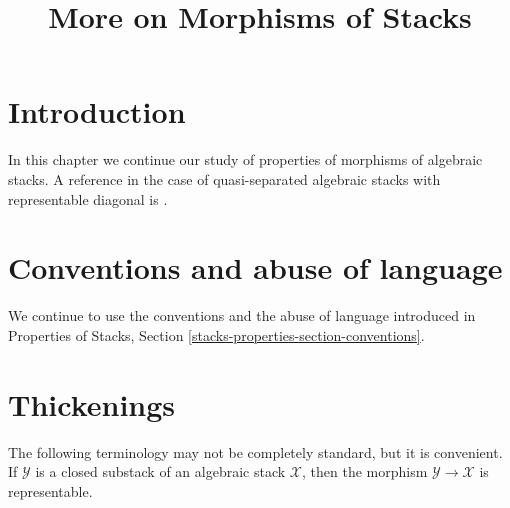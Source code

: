 

%


\title{More on Morphisms of Stacks}


\maketitle

\label{section-phantom}

\tableofcontents

\section{Introduction}
\label{section-introduction}

\noindent
In this chapter we continue our study of properties of morphisms of algebraic
stacks. A reference in the case of quasi-separated algebraic stacks with
representable diagonal is \cite{LM-B}.




\section{Conventions and abuse of language}
\label{section-conventions}

\noindent
We continue to use the conventions and the abuse of language
introduced in
Properties of Stacks, Section \ref{stacks-properties-section-conventions}.






\section{Thickenings}
\label{section-thickenings}

\noindent
The following terminology may not be completely standard, but it is convenient.
If $\mathcal{Y}$ is a closed substack of an algebraic stack $\mathcal{X}$,
then the morphism $\mathcal{Y} \to \mathcal{X}$ is representable.

